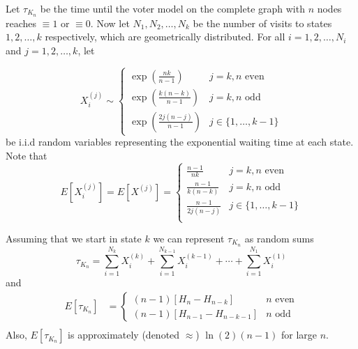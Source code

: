 \begin{theorem}
Let $\tau_{K_n}$ be the time until the voter model on the complete graph with $n$ nodes reaches $\equiv 1$ or $\equiv 0$.
Now let $N_1, N_2, \ldots, N_k$ be the number of visits to states $1, 2, \ldots, k$ respectively, which are geometrically distributed.
For all $i = 1,2,\ldots, N_i$ and $j = 1,2,\ldots, k$, let

$$
X_i^{(j)} \sim \begin{cases}
  \exp\left(\displaystyle \frac{nk}{n - 1}\right) & j = k, n \text{ even}\\[10pt]
  \exp\left(\displaystyle\frac{k (n - k)}{n - 1}\right) & j = k, n \text{ odd}\\[10pt]
  \exp\left(\displaystyle \frac{2j (n - j)}{n - 1}\right) & j \in \{1, \ldots, k-1\}
\end{cases}
$$
be i.i.d random variables representing the exponential waiting time at each state. Note that
$$
E[X_i^{(j)}] = E[X^{(j)}] = \begin{cases}
  \displaystyle \frac{n - 1}{nk} & j = k, n \text{ even}\\[10pt]
  \displaystyle \frac{n - 1}{k (n - k)} & j = k, n \text{ odd}\\[10pt]
  \displaystyle \frac{n - 1}{2j (n - j)} & j \in \{1,\ldots, k - 1\}\\
\end{cases}
$$

\noindent Assuming that we start in state $k$ we can represent $\tau_{K_n}$ as random sums
\begin{equation}\label{eq:wait_contact_sum_voter}
    \tau_{K_n} = \sum_{i = 1}^{N_k} X_i^{(k)} + \sum_{i = 1}^{N_{k - 1}} X_i^{(k - 1)} + \cdots + \sum_{i = 1}^{N_1} X_i^{(1)}
\end{equation}
and
\begin{align*}
E[\tau_{K_n}] &= \begin{cases}
    (n - 1) \left[H_{n} - H_{n - k}\right] & n \text{ even}\\
    (n - 1) \left[H_{n - 1} - H_{n - k - 1}\right] & n \text{ odd}
\end{cases}\\
\end{align*}
Also, $E[\tau_{K_n}]$ is approximately (denoted $\approx$) $\ln(2) (n - 1)$ for large $n$.
\end{theorem}

